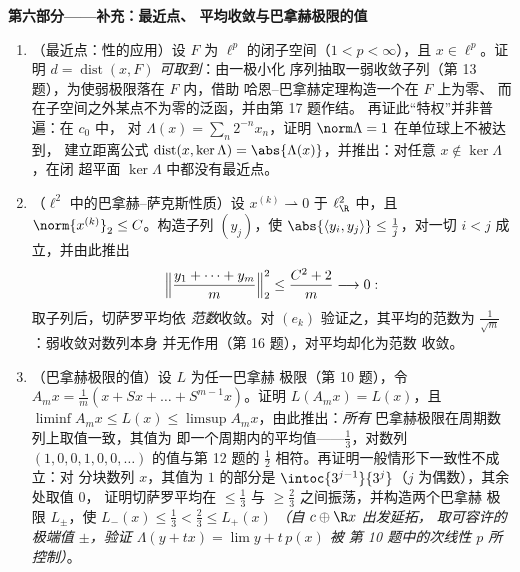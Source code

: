 \begin{problem}[{周末问题——$(\ell^p)' = \ell^q$，
自反性，以及 $\ell^\infty$ 的奇异性}]
\medskip
\noindent\textbf{第六部分——补充：最近点、
平均收敛与巴拿赫极限的值}
\begin{enumerate}[resume]
  \item （最近点：性的应用）设 $F$ 为
        $\ell^p$ 的闭子空间（$1 < p < \infty$），且
        $x \in \ell^p$。证明 $d = \operatorname{dist}(x,
        F)$ \emph{可取到}：由一极小化
        序列抽取一弱收敛子列（第
        13 题），为使弱极限落在 $F$ 内，借助
        哈恩--巴拿赫定理构造一个在 $F$ 上为零、
        而在子空间之外某点不为零的泛函，并由第 17 题作结。
        再证此“特权”并非普遍：在 $c_0$ 中，
        对 $\Lambda(x) = \sum_n2^{-n}x_n$，证明
        $\norm\Lambda = 1$ 在单位球上不被达到，
        建立距离公式
        $\operatorname{dist}(x, \ker\Lambda) =
        \abs{\Lambda(x)}$，并推出：对任意 $x \notin
        \ker\Lambda$，在闭
        超平面 $\ker\Lambda$ 中都没有最近点。
  \item （$\ell^2$ 中的巴拿赫--萨克斯性质）设 $x^{(k)}
        \rightharpoonup 0$ 于 $\ell^2_{\R}$ 中，且
        $\norm{x^{(k)}}_2 \leq C$。构造子列
        $(y_j)$，使 $\abs{\langle y_i, y_j\rangle} \leq
        \frac1j$，对一切 $i < j$ 成立，并由此推出
        \[
        \Bigl\lVert\frac{y_1 + \dots + y_m}m\Bigr\rVert_2^2
        \leq \frac{C^2 + 2}m \longrightarrow 0 :
        \]
        取子列后，切萨罗平均依
        \emph{范数}收敛。对 $(e_k)$ 验证之，其平均的范数为
        $\frac1{\sqrt m}$：弱收敛对数列本身
        并无作用（第 16 题），对平均却化为范数
        收敛。
  \item （巴拿赫极限的值）设 $L$ 为任一巴拿赫
        极限（第 10 题），令 $A_mx = \frac1m(x + Sx + \dots
        + S^{m-1}x)$。证明 $L(A_mx) = L(x)$，且 $\liminf A_mx
        \leq L(x) \leq \limsup A_mx$，由此推出：\emph{所有}
        巴拿赫极限在周期数列上取值一致，其值为
        即一个周期内的平均值——$\frac13$，对数列 $(1, 0, 0, 1,
        0, 0, \dots)$ 的值与第 12 题的
        $\frac12$ 相符。再证明一般情形下一致性不成立：对
        分块数列 $x$，其值为 $1$ 的部分是
        $\intoc{3^{j-1}}{3^j}$（$j$ 为偶数），其余处取值 $0$，
        证明切萨罗平均在 $\leq
        \frac13$ 与 $\geq \frac23$ 之间振荡，并构造两个巴拿赫
        极限 $L_\pm$，使 $L_-(x) \leq \frac13 < \frac23
        \leq L_+(x)$ \emph{（自 $c \oplus \R x$ 出发延拓，
        取可容许的极端值 $\pm$，验证
        $\Lambda(y + tx) = \lim y + t\,p(x)$ 被
        第 10 题中的次线性 $p$ 所控制）}。
\end{enumerate}
\end{problem}
